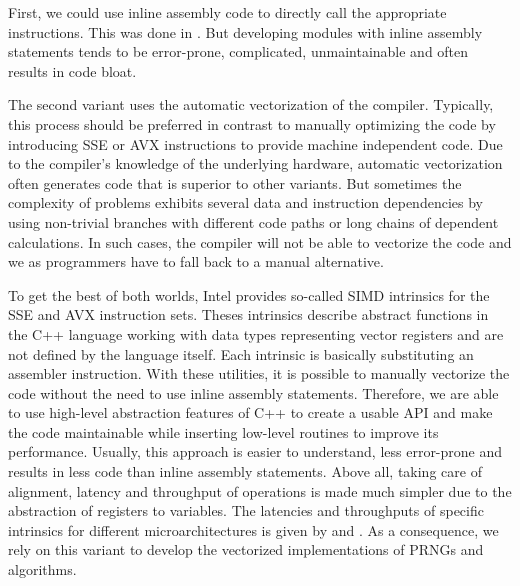 \documentclass{stdlocal}
\begin{document}
    First, we could use inline assembly code to directly call the appropriate instructions.
    This was done in \textcite{guskova2016,barash2017}.
    But developing modules with inline assembly statements tends to be error-prone, complicated, unmaintainable and often results in code bloat.

    The second variant uses the automatic vectorization of the compiler.
    Typically, this process should be preferred in contrast to manually optimizing the code by introducing SSE or AVX instructions to provide machine independent code.
    Due to the compiler's knowledge of the underlying hardware, automatic vectorization often generates code that is superior to other variants.
    But sometimes the complexity of problems exhibits several data and instruction dependencies by using non-trivial branches with different code paths or long chains of dependent calculations.
    In such cases, the compiler will not be able to vectorize the code and we as programmers have to fall back to a manual alternative.
    \autocite{fog2019a,fog2019b,fog2019c,fog2019d,fog2019e}

    To get the best of both worlds, Intel provides so-called SIMD intrinsics for the SSE and AVX instruction sets.
    Theses intrinsics describe abstract functions in the C++ language working with data types representing vector registers and are not defined by the language itself.
    Each intrinsic is basically substituting an assembler instruction.
    With these utilities, it is possible to manually vectorize the code without the need to use inline assembly statements.
    Therefore, we are able to use high-level abstraction features of C++ to create a usable API and make the code maintainable while inserting low-level routines to improve its performance.
    Usually, this approach is easier to understand, less error-prone and results in less code than inline assembly statements.
    Above all, taking care of alignment, latency and throughput of operations is made much simpler due to the abstraction of registers to variables.
    The latencies and throughputs of specific intrinsics for different microarchitectures is given by \textcite{intel-intrinsics-guide} and \textcite{fog2019d}.
    As a consequence, we rely on this variant to develop the vectorized implementations of PRNGs and algorithms.
    \autocite{intel-optimization-reference,fog2019a,fog2019b,fog2019c,fog2019d,fog2019e}
\end{document}
